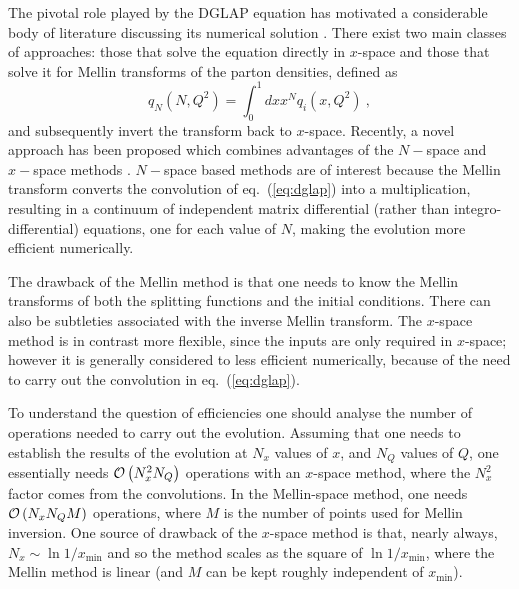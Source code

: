 \documentclass[12pt]{article}
\newcommand{\be}{\begin{equation}}
\newcommand{\ee}{\end{equation}}
\newcommand{\lp}{\left(}
\newcommand{\rp}{\right)}
\newcommand{\order}[1]{{\cal O}\left(#1\right)}
\newcommand{\AllDGLAP}{Botje,Schoeffel:1998tz,Pegasus,Pascaud:2001bi,Weinzierl:2002mv,coriano,GuzziThesis,nnpdf,Kosower:1997hg,Ratcliffe:2000kp}
\begin{document}
The pivotal role played by the DGLAP equation has motivated a
considerable body of literature discussing its numerical solution
\cite{\AllDGLAP}. There exist two main classes of approaches: those that
solve the equation directly in $x$-space and those that solve it for
Mellin transforms of the
parton densities, defined as
\be
q_{N}\lp N,Q^2\rp = \int_0^1 dx x^N q_i(x,Q^2) \ ,
\ee 
 and subsequently invert the transform back to
$x$-space.
 Recently, a novel approach has been proposed which combines
advantages of the $N-$space and $x-$space methods \cite{nnpdf}.
$N-$space based methods are of interest because the Mellin transform
converts the convolution of eq.~(\ref{eq:dglap}) into a multiplication,
resulting in a continuum of independent matrix differential (rather
than integro-differential) equations, one for each value of $N$,
making the evolution more efficient numerically.

The drawback of the Mellin method is that one needs to know the Mellin
transforms of both the splitting functions and the initial conditions.
There can also be subtleties associated with the inverse Mellin
transform.
%
The $x$-space method is in contrast more flexible, since the inputs
are only required in $x$-space; however it is generally considered to
less efficient numerically, because of the need to carry out the
convolution in eq.~(\ref{eq:dglap}).

To understand the question of efficiencies one should analyse the
number of operations needed to carry out the evolution. Assuming that
one needs to establish the results of the evolution at $N_x$ values of
$x$, and $N_Q$ values of $Q$, one essentially needs $\order{N_x^2
  N_Q}$ operations with an $x$-space method, where the $N_x^2$ factor
comes from the convolutions. In the Mellin-space method, one needs
$\order{N_x N_Q M}$ operations, where $M$ is the number of points used
for Mellin inversion. One source of drawback of the $x$-space method
is that, nearly always, $N_x \sim \ln 1/x_{\min}$ and so the method
scales as the square of $\ln 1/x_{\min}$, where the Mellin method is
linear (and $M$ can be kept roughly independent of $x_{\min}$). 
%
\end{document}
